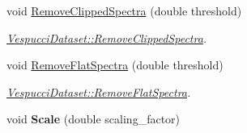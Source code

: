 \begin{DoxyCompactItemize}
\item 
void \hyperlink{class_vespucci_dataset_abd888e214b881eecb1979310adafa770}{Remove\+Clipped\+Spectra} (double threshold)
\begin{DoxyCompactList}\small\item\em \hyperlink{class_vespucci_dataset_abd888e214b881eecb1979310adafa770}{Vespucci\+Dataset\+::\+Remove\+Clipped\+Spectra}. \end{DoxyCompactList}\item 
void \hyperlink{class_vespucci_dataset_a1b5a22709b819e92ea63b8bd6ef9f04e}{Remove\+Flat\+Spectra} (double threshold)
\begin{DoxyCompactList}\small\item\em \hyperlink{class_vespucci_dataset_a1b5a22709b819e92ea63b8bd6ef9f04e}{Vespucci\+Dataset\+::\+Remove\+Flat\+Spectra}. \end{DoxyCompactList}\item 
void {\bfseries Scale} (double scaling\+\_\+factor)\hypertarget{class_vespucci_dataset_a6f0de5a5f353ac7405dfda1cf5626e50}{}\label{class_vespucci_dataset_a6f0de5a5f353ac7405dfda1cf5626e50}


\end{DoxyCompactItemize}
